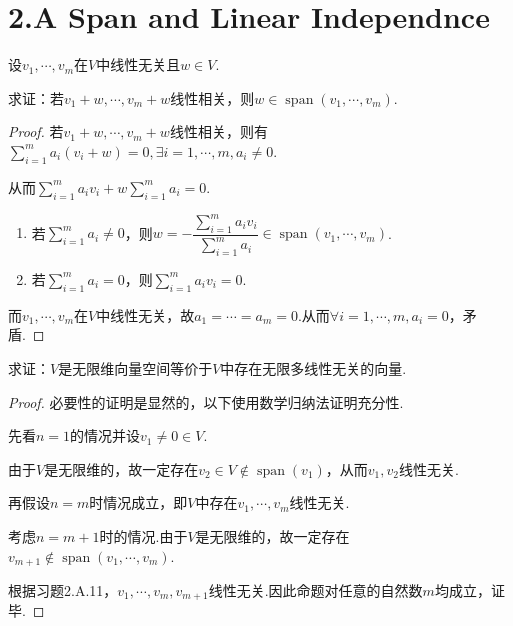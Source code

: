 \section{2.A Span and Linear Independnce}

\begin{problem}[10]\label{2.A.10}
    设\(v_1,\cdots,v_m\)在\(V\)中线性无关且\(w\in V\).

    求证：若\(v_1+w,\cdots,v_m+w\)线性相关，则\(w\in \operatorname{span} (v_1,\cdots,v_m)\).
\end{problem}

\begin{proof}
    若\(v_1+w,\cdots,v_m+w\)线性相关，则有\(\sum_{i=1}^m a_i(v_i+w)=0,\exists i=1,\cdots,m,a_i\ne 0\).
    
    从而\(\sum_{i=1}^m a_iv_i+w\sum_{i=1}^m a_i=0\).

    \begin{enumerate}
        \item 若\(\sum_{i=1}^m a_i\ne 0\)，则\(w=-\dfrac{\sum_{i=1}^m a_iv_i}{\sum_{i=1}^m a_i}\in \operatorname{span} (v_1,\cdots,v_m)\).
        \item 若\(\sum_{i=1}^m a_i=0\)，则\(\sum_{i=1}^m a_iv_i=0\).
    \end{enumerate}

    而\(v_1,\cdots,v_m\)在\(V\)中线性无关，故\(a_1=\cdots=a_m=0\).从而\(\forall i=1,\cdots,m, a_i=0\)，矛盾.
\end{proof}

\begin{problem}[13]\label{2.A.13}
    求证：\(V\)是无限维向量空间等价于\(V\)中存在无限多线性无关的向量.
\end{problem}

\begin{proof}
    必要性的证明是显然的，以下使用数学归纳法证明充分性.
    
    先看\(n=1\)的情况并设\(v_1 \ne 0 \in V\).
    
    由于\(V\)是无限维的，故一定存在\(v_2 \in V \notin \operatorname{span}(v_1)\)，从而\(v_1,v_2\)线性无关.
    
    再假设\(n=m\)时情况成立，即\(V\)中存在\(v_1,\cdots,v_m\)线性无关.
    
    考虑\(n=m+1\)时的情况.由于\(V\)是无限维的，故一定存在\(v_{m+1} \notin \operatorname{span}(v_1,\cdots,v_m)\).
    
    根据习题2.A.11，\(v_1,\cdots,v_m,v_{m+1}\)线性无关.因此命题对任意的自然数\(m\)均成立，证毕.
\end{proof}


